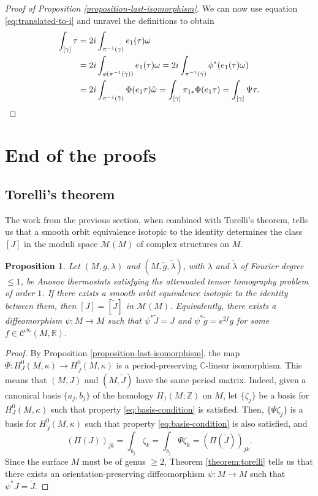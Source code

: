 \documentclass[reqno,12pt,letterpaper]{amsart}
\newtheorem{proposition}{Proposition}[section]
\theoremstyle{definition}
\theoremstyle{remark}
\theoremstyle{definition}
\numberwithin{equation}{section}
\newcommand{\R}{\mathbb{R}}
\newcommand{\Z}{\mathbb{Z}}
\begin{document}
\begin{proof}[Proof of Proposition \ref{proposition-last-isomorphism}]
We can now use equation \eqref{eq:translated-to-i} and unravel the definitions to obtain
\begin{align*}
\int_{[\gamma]}\tau &=2i\int_{\pi^{-1}(\gamma)} e_1(\tau)\omega\\
&=2i\int_{\phi(\pi^{-1}(\tilde{\gamma}))} e_1(\tau)\omega=2i\int_{\pi^{-1}(\tilde{\gamma})} \phi^*(e_1(\tau)\omega)\\
&=2i\int_{\pi^{-1}(\tilde{\gamma})} \Phi(e_1\tau)\tilde{\omega}=\int_{[\gamma]}\pi_{1\ast}\Phi(e_1\tau)=\int_{[\gamma]}\Psi\tau. \qedhere
\end{align*}
\end{proof}

\section{End of the proofs}\label{section:end-of-the-proofs}
\subsection{Torelli's theorem}
The work from the previous section, when combined with Torelli's theorem, tells us that a smooth orbit equivalence isotopic to the identity determines the class $[J]$ in the moduli space $\mathcal{M}(M)$ of complex structures on $M$. 

\begin{proposition}\label{proposition-moduli-space}
Let $(M, g, \lambda)$ and $(M, \tilde{g}, \tilde{\lambda})$, with $\lambda$ and $\tilde{\lambda}$ of Fourier degree $\leq 1$, be Anosov thermostats satisfying the attenuated tensor tomography problem of order $1$. If there exists a smooth orbit equivalence isotopic to the identity between them, then $[J]=[\widetilde{J}]$ in $\mathcal{M}(M)$. Equivalently, there exists a diffeomorphism $\psi : M\to M$ such that $\psi^*\widetilde{J}=J$ and $\psi^*\tilde{g}=e^{2f}g$ for some $f\in \mathcal{C}^\infty(M, \R)$. 
\end{proposition}
\begin{proof}
By Proposition \ref{proposition-last-isomorphism}, the map $\Psi: H^0_J(M, \kappa)\to H^0_{\widetilde{J}}(M, \kappa)$ is a period-preserving $\mathbb{C}$-linear isomorphism. This means that $(M, J)$ and $(M, \widetilde{J})$ have the same period matrix. Indeed, given a canonical basis $\{a_j, b_j\}$ of the homology $H_1(M;\Z)$ on $M$, let $\{\zeta_j\}$ be a basis for $H_J^0(M,\kappa)$ such that property \eqref{eq:basis-condition} is satisfied. Then, $\{\Psi\zeta_j\}$ is a basis for $H^0_{\widetilde{J}}(M, \kappa)$ such that property \eqref{eq:basis-condition} is also satisfied, and
$$(\Pi(J))_{jk}=\int_{b_j}\zeta_k =\int_{b_j}\Psi\zeta_k = (\Pi(\widetilde{J}))_{jk}.$$
Since the surface $M$ must be of genus $\geq 2$, Theorem \ref{theorem:torelli} tells us that there exists an orientation-preserving diffeomorphism $\psi : M\to M$ such that $\psi^*J= \widetilde{J}$. 
\end{proof}
\end{document}
